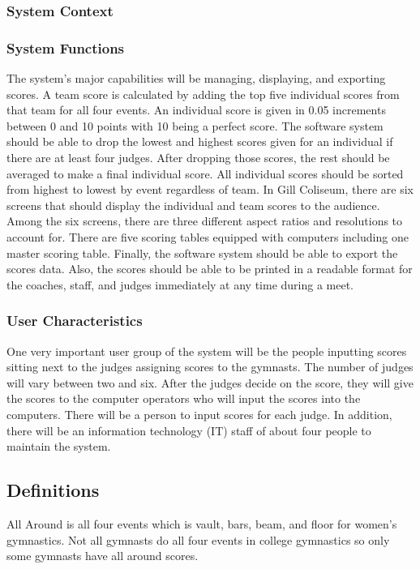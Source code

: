 \documentclass[letterpaper,10pt,draftclsnofoot,onecolumn,]{article}
\begin{document}
\subsubsection{System Context}

\newline
\subsubsection{System Functions}
The system's major capabilities will be managing, displaying, and exporting scores. A team score is calculated by adding the top five individual scores from that team for all four events. An individual score is given in 0.05 increments between 0 and 10 points with 10 being a perfect score. The software system should be able to drop the lowest and highest scores given for an individual if there are at least four judges. After dropping those scores, the rest should be averaged to make a final individual score. All individual scores should be sorted from highest to lowest by event regardless of team. In Gill Coliseum, there are six screens that should display the individual and team scores to the audience. Among the six screens, there are three different aspect ratios and resolutions to account for. There are five scoring tables equipped with computers including one master scoring table. Finally, the software system should be able to export the scores data. Also, the scores should be able to be printed in a readable format for the coaches, staff, and judges immediately at any time during a meet.

\subsubsection{User Characteristics}
One very important user group of the system will be the people inputting scores sitting next to the judges assigning scores to the gymnasts. The number of judges will vary between two and six. After the judges decide on the score, they will give the scores to the computer operators who will input the scores into the computers. There will be a person to input scores for each judge. In addition, there will be an information technology (IT) staff of about four people to maintain the system.


\subsection{Definitions}
All Around is all four events which is vault, bars, beam, and floor for women's gymnastics. Not all gymnasts do all four events in college gymnastics so only some gymnasts have all around scores.\\
\end{document}
